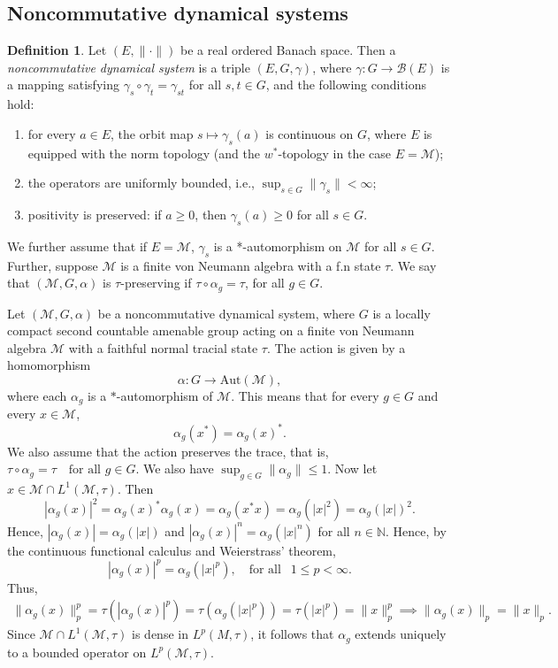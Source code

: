 \documentclass[11pt]{amsart}
\theoremstyle{definition}
\newtheorem{defn}[thm]{Definition}
\theoremstyle{myremark}
\numberwithin{equation}{section}
\newcommand{\CM}{\mathcal{M}}
\begin{document}
\subsection{Noncommutative dynamical systems}
\begin{defn}\label{nc dyn sys} Let \((E,\|\cdot\|)\) be a real ordered Banach space.
Then a \emph{noncommutative dynamical system} is a triple \((E,G,\gamma)\), where \(\gamma : G \to \mathcal{B}(E)\) is a mapping satisfying \(\gamma_s \circ \gamma_t = \gamma_{st}\) for all \(s,t \in G\), and the following conditions hold:
\begin{enumerate}
    \item for every \(a \in E\), the orbit map \(s \mapsto \gamma_s(a)\) is continuous on \(G\), where \(E\) is equipped with the norm topology (and the \(w^*\)-topology in the case \(E=\mathcal{M}\));
    \item the operators are uniformly bounded, i.e., \(\sup_{s \in G}\|\gamma_s\| < \infty\);
    \item positivity is preserved: if \(a \ge 0\), then \(\gamma_s(a) \ge 0\) for all \(s\in G\).
    
\end{enumerate}
\end{defn}
\noindent We further assume that if $E = \CM$, $\gamma_{s}$ is a *-automorphism on $\CM$ for all $s \in G$.
Further, suppose $ \CM$ is a finite von Neumann algebra with a f.n state $ \tau.$ We say that $(\CM, G, \alpha)$ is $\tau$-preserving if $ \tau \circ \alpha_g = \tau$, for all $ g \in G.$

\noindent Let $(\CM, G, \alpha)$ be a noncommutative dynamical system, where $G$ is a locally compact second countable amenable group acting on a finite von Neumann algebra $\CM$ with a faithful normal tracial state $\tau.$ 
The action is given by a homomorphism
\[
\alpha : G \to \mathrm{Aut}(\CM),
\]
where each $\alpha_g$ is a $*$-automorphism of $\CM$. This means that for every $g \in G$ and every $x \in \CM$,
\[
\alpha_g(x^*) = \alpha_g(x)^*.
\]
We also assume that the action preserves the trace, that is, $ \tau \circ \alpha_g = \tau \quad \text{for all } g \in G$.  We also have 
$\displaystyle\sup_{g \in G} \|\alpha_g\| \leq 1. $  Now let $x \in \CM \cap L^1(\CM, \tau)$. Then
\[
|\alpha_g(x)|^2=\alpha_g(x)^*\alpha_g(x) = \alpha_g(x^*x)=\alpha_g(|x|^2)=\alpha_g(|x|)^2.
\]
Hence, $ |\alpha_g(x)|=\alpha_g(|x|)$  and $|\alpha_g(x)|^n=\alpha_g(|x|^n) $ for all $ n \in \mathbb{N}$.
Hence,  by the continuous functional calculus and Weierstrass' theorem, 
\[|\alpha_g(x)|^p=\alpha_g(|x|^p), ~~~ \text{ for all }~~ 1\leq p < \infty.\]\label{alphamodx}
Thus,\begin{align*}
    \|\alpha_g(x)\|^p_p = \tau(|\alpha_g(x)|^p)=\tau(\alpha_g(|x|^p))=\tau(|x|^p)=\|x\|^p_p
    \implies \|\alpha_g(x)\|_p = \|x\|_p.
\end{align*}
\noindent Since $\CM \cap L^1(\CM, \tau)$ is dense in $L^p(M, \tau)$, it follows that $\alpha_g$ extends uniquely to a bounded operator on $L^p(\CM, \tau).$
\end{document}
